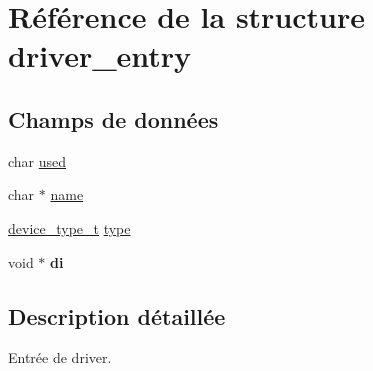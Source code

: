 \hypertarget{structdriver__entry}{\section{Référence de la structure driver\-\_\-entry}
\label{structdriver__entry}
}
\subsection*{Champs de données}
\begin{DoxyCompactItemize}
\item 
char \hyperlink{structdriver__entry_a9a2a74aad52e09fb03bef9703530e28f}{used}
\item 
char $\ast$ \hyperlink{structdriver__entry_afc014b612d6cedf602aab7255d4576c1}{name}
\item 
\hyperlink{devfs_8h_ae865497b0eca6bed21898d4ca1fc0ddd}{device\-\_\-type\-\_\-t} \hyperlink{structdriver__entry_a3d74a551a1bbb2f2583ba058877b52a4}{type}
\item 
\hypertarget{structdriver__entry_ab5b691637ec5edbbe58442fc57f5aba4}{void $\ast$ {\bfseries di}}\label{structdriver__entry_ab5b691637ec5edbbe58442fc57f5aba4}

\end{DoxyCompactItemize}


\subsection{Description détaillée}
Entrée de driver. 

